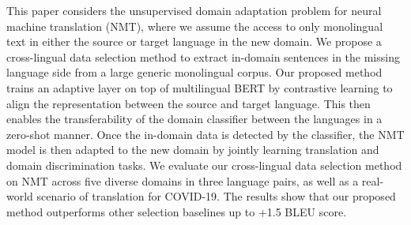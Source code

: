 This paper considers the unsupervised domain adaptation problem for neural machine translation (NMT), where we assume the access to only monolingual text in either the source or target language in the new domain. We propose a cross-lingual data selection method to extract in-domain sentences in the missing language side from a large generic monolingual corpus. Our proposed method trains an adaptive layer on top of multilingual BERT by contrastive learning to align the representation between the source and target language. This then enables the transferability of the domain classifier between the languages in a zero-shot manner. Once the in-domain data is detected by the classifier, the NMT model is then adapted to the new domain by jointly learning translation and domain discrimination tasks. We evaluate our cross-lingual data selection method on NMT across five diverse domains in three language pairs, as well as a real-world scenario of translation for COVID-19. The results show that our proposed method outperforms other selection baselines up to +1.5 BLEU score.
